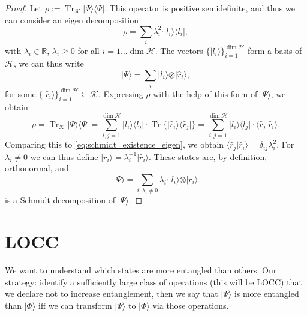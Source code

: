 \documentclass{article}
\theoremstyle{definition}
\newcommand{\tr}{\operatorname{Tr}}
\newcommand{\ket}[1]{\vert #1 \rangle}
\newcommand{\bra}[1]{\langle #1 \vert}
\newcommand{\scalprod}[2]{\langle #1 \vert #2 \rangle}
\begin{document}
\begin{proof}
  Let $\rho := \tr_{\mathcal{K}} \ket{\Psi}\bra{\Psi}$. This operator is positive semidefinite, and thus we can consider an eigen decomposition
  \begin{equation}\label{eq:schmidt_existence_eigen}
    \rho = \sum_i \lambda_i^2 \cdot \ket{l_i}\bra{l_i},
  \end{equation}
  with $\lambda_i\in\mathbb{R}$, $\lambda_i\geq 0$ for all $i=1\dots \dim\mathcal{H}$. The vectors $\{\ket{l_i}\}_{i=1}^{\dim \mathcal{H}}$ form a basis of $\mathcal{H}$, we can thus write 
  \begin{equation*}
    \ket{\Psi}  = \sum_i \ket{l_i} \otimes \ket{\hat{r}_i},
  \end{equation*}
  for some $\{\ket{\hat{r}_i}\}_{i=1}^{\dim \mathcal{H}}\subseteq \mathcal{K}$. Expressing $\rho$ with the help of this form of $\ket{\Psi}$, we obtain 
  \begin{equation*}
    \rho = \tr_{\mathcal{K}} \ket{\Psi}\bra{\Psi} = \sum_{i,j=1}^{\dim \mathcal{H}} \ket{l_i}\bra{l_j} \cdot \tr \{ \ket{\hat{r}_i}\bra{\hat{r}_j}\}= \sum_{i,j=1}^{\dim \mathcal{H}} \ket{l_i}\bra{l_j} \cdot \scalprod{\hat{r}_j}{\hat{r}_i}.
  \end{equation*}
  Comparing this to \cref{eq:schmidt_existence_eigen}, we obtain $\scalprod{\hat{r}_j}{\hat{r}_i} = \delta_{ij} \lambda_i^2$. For $\lambda_i\neq 0$ we can thus define  $\ket{r_i} = \lambda_i^{-1} \ket{\hat{r}_i}$. These states are, by definition, orthonormal, and 
  \begin{equation*}
    \ket{\Psi} = \sum_{i: \lambda_i\neq 0} \lambda_i \cdot \ket{l_i} \otimes \ket{r_i}
  \end{equation*}
  is a Schmidt decomposition of $\ket{\Psi}$.
\end{proof}

\section{LOCC}

We want to understand which states are more entangled than others. Our strategy: identify a sufficiently large class of operations (this will be LOCC) that we declare not to increase entanglement, then we say that $\ket{\Psi}$ is more entangled than $\ket{\Phi}$ iff we can transform $\ket{\Psi}$ to $\ket{\Phi}$ via those operations.  
\end{document}
